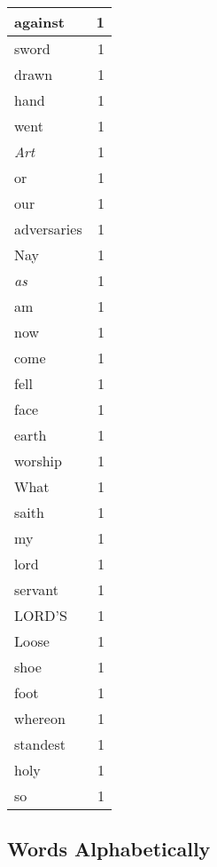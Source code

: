 \begin{center}
\begin{longtable}{l|r}
against & 1 \\ \hline
sword & 1 \\ \hline
drawn & 1 \\ \hline
hand & 1 \\ \hline
went & 1 \\ \hline
\emph{Art} & 1 \\ \hline
or & 1 \\ \hline
our & 1 \\ \hline
adversaries & 1 \\ \hline
Nay & 1 \\ \hline
\emph{as} & 1 \\ \hline
am & 1 \\ \hline
now & 1 \\ \hline
come & 1 \\ \hline
fell & 1 \\ \hline
face & 1 \\ \hline
earth & 1 \\ \hline
worship & 1 \\ \hline
What & 1 \\ \hline
saith & 1 \\ \hline
my & 1 \\ \hline
lord & 1 \\ \hline
servant & 1 \\ \hline
LORD'S & 1 \\ \hline
Loose & 1 \\ \hline
shoe & 1 \\ \hline
foot & 1 \\ \hline
whereon & 1 \\ \hline
standest & 1 \\ \hline
holy & 1 \\ \hline
so & 1 \\ \hline
\end{longtable}
\end{center}



\normalsize



\subsection{Words Alphabetically}

